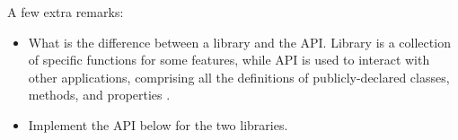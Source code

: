 \documentclass[a4paper]{article}
\begin{document}
A few extra remarks:
\begin{itemize}
    \item What is the difference between a library and the API.
    Library is a collection of specific functions for some features, while API is used to interact with other applications, comprising all the definitions of publicly-declared classes, methods, and properties \cite{libapi}.
    \item Implement the API below for the two libraries.
\end{itemize}
\printbibliography
\end{document}
